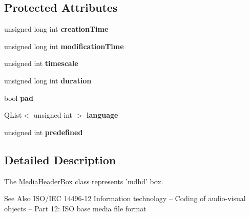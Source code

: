 \subsection*{Protected Attributes}
\begin{DoxyCompactItemize}
\item 
\hypertarget{class_media_header_box_aa31498fefedc9b9077a7486f76140ecd}{unsigned long int {\bfseries creation\-Time}}\label{class_media_header_box_aa31498fefedc9b9077a7486f76140ecd}

\item 
\hypertarget{class_media_header_box_a872193550ac3891acf96df43e91154dc}{unsigned long int {\bfseries modification\-Time}}\label{class_media_header_box_a872193550ac3891acf96df43e91154dc}

\item 
\hypertarget{class_media_header_box_a3790a43230e4737e452a6fec809c89fc}{unsigned int {\bfseries timescale}}\label{class_media_header_box_a3790a43230e4737e452a6fec809c89fc}

\item 
\hypertarget{class_media_header_box_a4d026fb742aba8692402ff4e04b8a1d7}{unsigned long int {\bfseries duration}}\label{class_media_header_box_a4d026fb742aba8692402ff4e04b8a1d7}

\item 
\hypertarget{class_media_header_box_a34c0881b8a18ae6f7678f03ed4df68be}{bool {\bfseries pad}}\label{class_media_header_box_a34c0881b8a18ae6f7678f03ed4df68be}

\item 
\hypertarget{class_media_header_box_aad810d8fe025eb93601325ab71b44868}{Q\-List$<$ unsigned int $>$ {\bfseries language}}\label{class_media_header_box_aad810d8fe025eb93601325ab71b44868}

\item 
\hypertarget{class_media_header_box_a230fa2799a86d0847076b33dcbe0d3d4}{unsigned int {\bfseries predefined}}\label{class_media_header_box_a230fa2799a86d0847076b33dcbe0d3d4}

\end{DoxyCompactItemize}


\subsection{Detailed Description}
The \hyperlink{class_media_header_box}{Media\-Header\-Box} class represents 'mdhd' box. 

\begin{DoxySeeAlso}{See Also}
I\-S\-O/\-I\-E\-C 14496-\/12 Information technology – Coding of audio-\/visual objects – Part 12\-: I\-S\-O base media file format 
\end{DoxySeeAlso}


